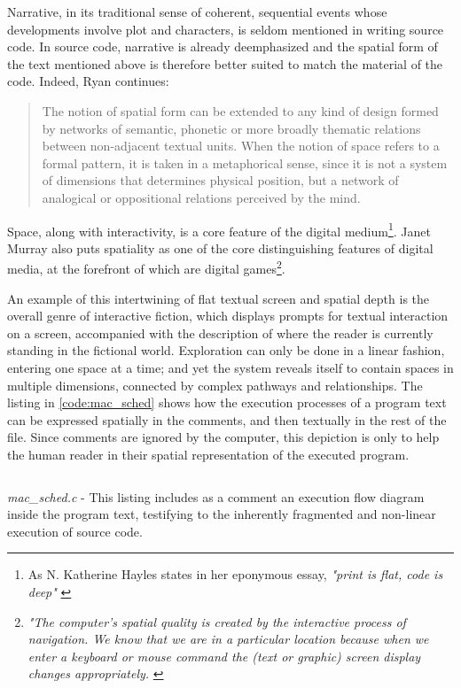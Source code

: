 Narrative, in its traditional sense of coherent, sequential events whose developments involve plot and characters, is seldom mentioned in writing source code. In source code, narrative is already deemphasized and the spatial form of the text mentioned above is therefore better suited to match the material of the code. Indeed, Ryan continues:

\begin{quote}
    The notion of spatial form can be extended to any kind of design formed by networks of semantic, phonetic or more broadly thematic relations between non-adjacent textual units. When the notion of space refers to a formal pattern, it is taken in a metaphorical sense, since it is not a system of dimensions that determines physical position, but a network of analogical or oppositional relations perceived by the mind. \citep{ryan_space_2009}
\end{quote}

Space, along with interactivity, is a core feature of the digital medium\footnote{As N. Katherine Hayles states in her eponymous essay, \emph{"print is flat, code is deep"} \citep{hayles_print_2004}}. Janet Murray also puts spatiality as one of the core distinguishing features of digital media, at the forefront of which are digital games\footnote{\emph{"The computer's spatial quality is created by the interactive process of navigation. We know that we are in a particular location because when we enter a keyboard or mouse command the (text or graphic) screen display changes appropriately.} \citep{murray_hamlet_1998}}.

An example of this intertwining of flat textual screen and spatial depth is the overall genre of interactive fiction, which displays prompts for textual interaction on a screen, accompanied with the description of where the reader is currently standing in the fictional world. Exploration can only be done in a linear fashion, entering one space at a time; and yet the system reveals itself to contain spaces in multiple dimensions, connected by complex pathways and relationships. The listing in \autoref{code:mac_sched} shows how the execution processes of a program text can be expressed spatially in the comments, and then textually in the rest of the file. Since comments are ignored by the computer, this depiction is only to help the human reader in their spatial representation of the executed program.

\begin{listing}
    \inputminted[]{c}{./corpus/mac_sched.c}
    \caption{\emph{mac\_sched.c} - This listing includes as a comment an execution flow diagram inside the program text, testifying to the inherently fragmented and non-linear execution of source code. \citep{mustacchi_mac_2019}}
    \label{code:mac_sched}
\end{listing}

